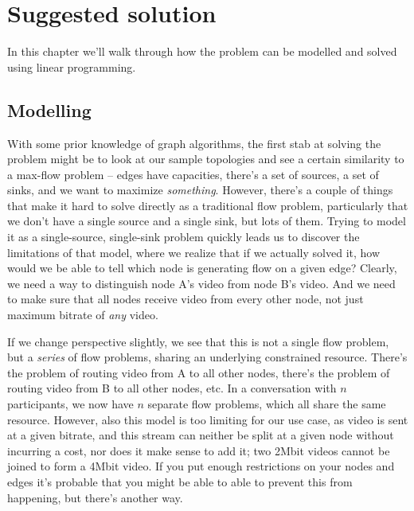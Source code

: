 \chapter{Suggested solution}
\label{chp:suggested-solution}

In this chapter we'll walk through how the problem can be modelled and solved using linear programming.


\section{Modelling}

With some prior knowledge of graph algorithms, the first stab at solving the problem might be to look at our sample topologies and see a certain similarity to a max-flow problem -- edges have capacities, there's a set of sources, a set of sinks, and we want to maximize \emph{something}. However, there's a couple of things that make it hard to solve directly as a traditional flow problem, particularly that we don't have a single source and a single sink, but lots of them. Trying to model it as a single-source, single-sink problem quickly leads us to discover the limitations of that model, where we realize that if we actually solved it, how would we be able to tell which node is generating flow on a given edge? Clearly, we need a way to distinguish node A's video from node B's video. And we need to make sure that all nodes receive video from every other node, not just maximum bitrate of \emph{any} video.

If we change perspective slightly, we see that this is not a single flow problem, but a \emph{series} of flow problems, sharing an underlying constrained resource. There's the problem of routing video from A to all other nodes, there's the problem of routing video from B to all other nodes, etc. In a conversation with $n$ participants, we now have $n$ separate flow problems, which all share the same resource. However, also this model is too limiting for our use case, as video is sent at a given bitrate, and this stream can neither be split at a given node without incurring a cost, nor does it make sense to add it; two 2Mbit videos cannot be joined to form a 4Mbit video. If you put enough restrictions on your nodes and edges it's probable that you might be able to able to prevent this from happening, but there's another way.

